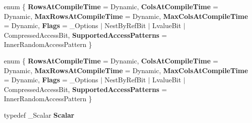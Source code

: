 \begin{DoxyCompactItemize}
\item 
\mbox{\label{struct_eigen_1_1internal_1_1traits_3_01_sparse_matrix_3_01___scalar_00_01___options_00_01___storage_index_01_4_01_4_af737ce5b59911af8c997bfb25f0b977d}} 
enum \{ \newline
{\bfseries Rows\+At\+Compile\+Time} = Dynamic, 
{\bfseries Cols\+At\+Compile\+Time} = Dynamic, 
{\bfseries Max\+Rows\+At\+Compile\+Time} = Dynamic, 
{\bfseries Max\+Cols\+At\+Compile\+Time} = Dynamic, 
\newline
{\bfseries Flags} = \+\_\+\+Options $\vert$ Nest\+By\+Ref\+Bit $\vert$ Lvalue\+Bit $\vert$ Compressed\+Access\+Bit, 
{\bfseries Supported\+Access\+Patterns} = Inner\+Random\+Access\+Pattern
 \}
\item 
\mbox{\label{struct_eigen_1_1internal_1_1traits_3_01_sparse_matrix_3_01___scalar_00_01___options_00_01___storage_index_01_4_01_4_a2db96222180937da56b68ae9e965e3f4}} 
enum \{ \newline
{\bfseries Rows\+At\+Compile\+Time} = Dynamic, 
{\bfseries Cols\+At\+Compile\+Time} = Dynamic, 
{\bfseries Max\+Rows\+At\+Compile\+Time} = Dynamic, 
{\bfseries Max\+Cols\+At\+Compile\+Time} = Dynamic, 
\newline
{\bfseries Flags} = \+\_\+\+Options $\vert$ Nest\+By\+Ref\+Bit $\vert$ Lvalue\+Bit $\vert$ Compressed\+Access\+Bit, 
{\bfseries Supported\+Access\+Patterns} = Inner\+Random\+Access\+Pattern
 \}
\item 
\mbox{\label{struct_eigen_1_1internal_1_1traits_3_01_sparse_matrix_3_01___scalar_00_01___options_00_01___storage_index_01_4_01_4_ad0e6647374d156a8f13a326947066e6a}} 
typedef \+\_\+\+Scalar {\bfseries Scalar}
\item 
\mbox{\label{struct_eigen_1_1internal_1_1traits_3_01_sparse_matrix_3_01___scalar_00_01___options_00_01___storage_index_01_4_01_4_a02b08163915b463d17c6eeee4fca6ca6}} 

\end{DoxyCompactItemize}

